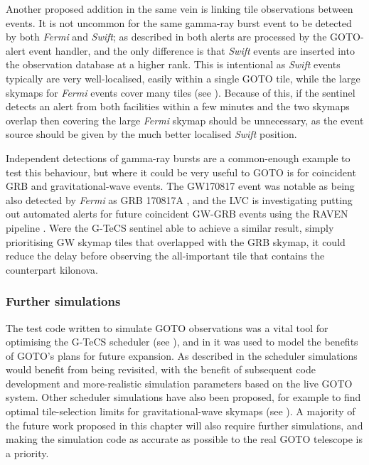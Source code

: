 \begin{colsection}
Another proposed addition in the same vein is linking tile observations between events. It is not uncommon for the same gamma-ray burst event to be detected by both \textit{Fermi} and \textit{Swift}; as described in  both alerts are processed by the GOTO-alert event handler, and the only difference is that \textit{Swift} events are inserted into the observation database at a higher rank. This is intentional as \textit{Swift} events typically are very well-localised, easily within a single GOTO tile, while the large skymaps for \textit{Fermi} events cover many tiles (see ). Because of this, if the sentinel detects an alert from both facilities within a few minutes and the two skymaps overlap then covering the large \textit{Fermi} skymap should be unnecessary, as the event source should be given by the much better localised \textit{Swift} position.

Independent detections of gamma-ray bursts are a common-enough example to test this behaviour, but where it could be very useful to GOTO is for coincident GRB and gravitational-wave events. The GW170817 event was notable as being also detected by \textit{Fermi} as GRB 170817A \citep{GW170817_Fermi}, and the LVC is investigating putting out automated alerts for future coincident GW-GRB events using the RAVEN pipeline \citep{RAVEN, LVC_userguide}. Were the G-TeCS sentinel able to achieve a similar result, simply prioritising GW skymap tiles that overlapped with the GRB skymap, it could reduce the delay before observing the all-important tile that contains the counterpart kilonova.

\subsubsection{Further simulations}

The test code written to simulate GOTO observations was a vital tool for optimising the G-TeCS scheduler (see ), and in  it was used to model the benefits of GOTO's plans for future expansion. As described in  the scheduler simulations would benefit from being revisited, with the benefit of subsequent code development and more-realistic simulation parameters based on the live GOTO system. Other scheduler simulations have also been proposed, for example to find optimal tile-selection limits for gravitational-wave skymaps (see ). A majority of the future work proposed in this chapter will also require further simulations, and making the simulation code as accurate as possible to the real GOTO telescope is a priority.


\end{colsection}
